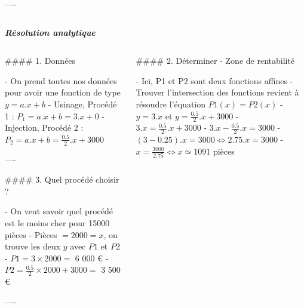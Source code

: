 \documentclass{beamer}
\begin{document}
\begin{frame}[fragile]
\begin{columns}
\begin{column}{.4\textwidth}
\begin{markdown}
----
\end{markdown}


\end{column}

\end{columns}

\bigskip

\textbf{\textit{Résolution analytique}}

\bigskip
    
\begin{columns}[T]

\begin{column}{.46\textwidth}

\begin{markdown}

#### 1. Données 

- On prend toutes nos données pour avoir une fonction de type $y=a.x+b$
- Usinage, Procédé 1 :  $P_1= a. x + b = 3.x + 0$
- Injection, Procédé 2 :  $P_2= a. x + b = \frac{0.5}{2}.x + 3000$

----


#### 3. Quel procédé choisir ?

- On veut savoir quel procédé est le moins cher pour 15000 pièces
- Pièces $=2000 = x $, on trouve les deux $y$ avec $P1$ et $P2$
- $P1=3 \times 2000 =$ 6 000 \euro
- $P2=\frac{0.5}{2} \times 2000 + 3000 =$ 3 500 \euro





----


\end{markdown}



\end{column}









\begin{column}{.46\textwidth}

\begin{markdown}

#### 2. Déterminer - Zone de rentabilité

- Ici, P1 et P2 sont deux fonctions affines 
- Trouver l'intersection des fonctions revient à résoudre l'équation $P1(x) = P2(x)$
- $y=3.x$ et $y=\frac{0.5}{2}.x+3000$
- $3.x=\frac{0.5}{2}.x+3000$
- $3.x-\frac{0.5}{2}.x=3000$
- $(3-0.25).x = 3000 \Leftrightarrow 2.75.x =3000$
- $x=\frac{3000}{2.75} \Leftrightarrow x \simeq 1091$ pièces




\end{markdown}
\end{column}
\end{columns}
\end{frame}
\end{document}

